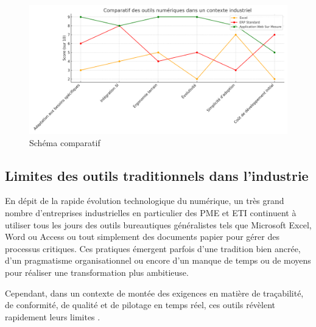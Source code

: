 \documentclass[11pt,a4paper]{article}
\begin{document}
\begin{figure}[H]
    \centering
    \includegraphics[width=\textwidth]{../Images/app-mesure.png}
    \caption{Schéma comparatif}
\end{figure}

\newpage
\subsection{Limites des outils traditionnels dans l’industrie}

En dépit de la rapide évolution technologique du numérique, un très grand nombre d’entreprises industrielles en particulier des PME et ETI continuent à utiliser tous les jours des outils bureautiques généralistes tels que Microsoft Excel, Word ou Access ou tout simplement des documents papier pour gérer des processus critiques. Ces pratiques émergent parfois d’une tradition bien ancrée, d’un pragmatisme organisationnel ou encore d’un manque de temps ou de moyens pour réaliser une transformation plus ambitieuse.

Cependant, dans un contexte de montée des exigences en matière de traçabilité, de conformité, de qualité et de pilotage en temps réel, ces outils révèlent rapidement leurs limites \cite{bib:industrieavenir, bib:bain2019}.
\end{document}
